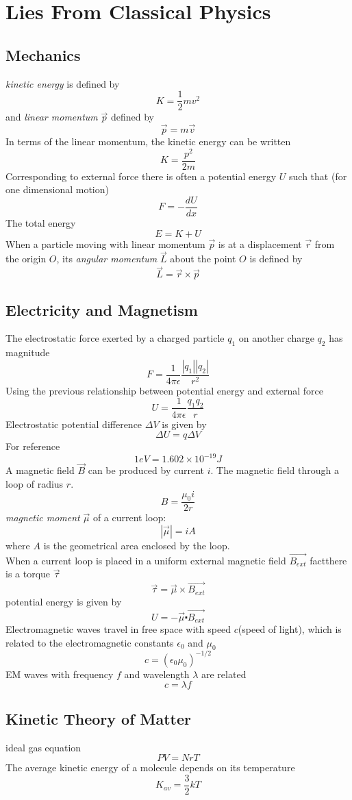 \chapter{Lies From Classical Physics}
\section{Mechanics}
\textit{kinetic energy} is defined by \[ K = \dfrac{1}{2} mv^2 \]
and \textit{linear momentum} $ \vec{p} $ defined by \[ \vec{p} = m \vec{v} \]
In terms of the linear momentum, the kinetic energy can be written \[ K = \dfrac{p^2}{2m} \]
Corresponding to external force there is often a potential energy $ U $ such that (for one dimensional motion)
\[ F = -\dfrac{dU}{dx} \]
The total energy \[ E = K +U \]
When a particle moving with linear momentum $ \vec{p} $ is at a displacement $ \vec{r} $ from the origin $ O $, its \textit{angular momentum} $ \vec{L} $ about the point $ O $ is defined by \[ \vec{L} = \vec{r} \times \vec{p} \]
\section{Electricity and Magnetism}
The electrostatic force exerted by a charged particle $ q_1 $ on another charge $ q_2 $ has magnitude 
\[ F = \dfrac{1}{4 \pi \epsilon} \dfrac{|q_1||q_2|}{r^2} \] 
Using the previous relationship between potential energy and external force 
\[ U = \dfrac{1}{4 \pi \epsilon} \dfrac{q_1 q_2}{r} \] 
Electrostatic potential difference $ \Delta V $ is given by
\[ \Delta U = q \Delta V \]
For reference
\[ 1 eV = 1.602 \times 10^{-19}J \]
A magnetic field $ \vec{B} $ can be produced by current $ i $. The magnetic field through a loop of radius $ r $. 
\[ B = \dfrac{\mu_0 i}{2r} \]
\textit{magnetic moment} $ \vec{\mu} $ of a current loop:
\[ |\vec{\mu}| = iA\]
where $ A $ is the geometrical area enclosed by the loop. \\
When a current loop is placed in a uniform external magnetic field $ \vec{B_{ext}} $ factthere is a torque $ \vec{\tau} $ \[ \vec{\tau} = \vec{\mu} \times \vec{B_{ext}} \]
potential energy is given by
\[ U = - \vec{\mu} \centerdot \vec{B_{ext}} \]
Electromagnetic waves travel in free space with speed $ c $(speed of light), which is related to the electromagnetic constants $ \epsilon_0 $ and $ \mu_0 $
\[ c = (\epsilon_0 \mu_0)^{-1/2} \]
EM waves with frequency $ f $ and wavelength $ \lambda $ are related 
\[ c = \lambda f \]
\section{Kinetic Theory of Matter}
ideal gas equation 
\[ PV = NrT \]
The average kinetic energy of a molecule depends on its temperature \[ K_{av} = \dfrac{3}{2} kT \]
